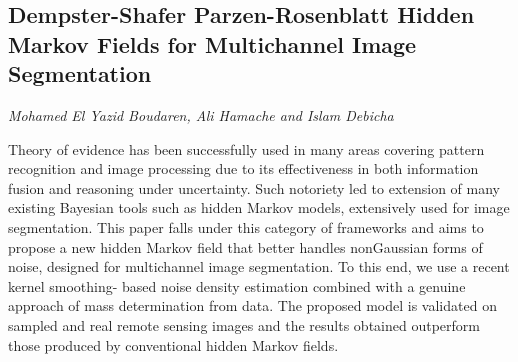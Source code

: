 \documentclass[../booklet.tex]{subfiles}
\begin{document}
\subsection[Dempster-Shafer Parzen-Rosenblatt Hidden Markov Fields for Multichannel Image Segmentation. {\it Mohamed El Yazid Boudaren, Ali Hamache and Islam Debicha}]{Dempster-Shafer Parzen-Rosenblatt Hidden Markov Fields for Multichannel Image Segmentation}
  

\begin{center}
  {\it Mohamed El Yazid Boudaren, Ali Hamache and Islam Debicha}
\end{center}

\vskip 0.8cm


Theory of evidence has been successfully used in many areas covering pattern recognition and image processing due to its effectiveness in both information fusion and reasoning under uncertainty. Such notoriety led to extension of many existing Bayesian tools such as hidden Markov models, extensively used for image segmentation.
This paper falls under this category of frameworks and aims to propose a new hidden Markov field that better handles nonGaussian forms of noise, designed for multichannel image segmentation. To this end, we use a recent kernel smoothing- based noise density estimation combined with a genuine approach of mass determination from data. The proposed model is validated on sampled and real remote sensing images and the results obtained outperform those produced by conventional hidden Markov fields.
\end{document}
